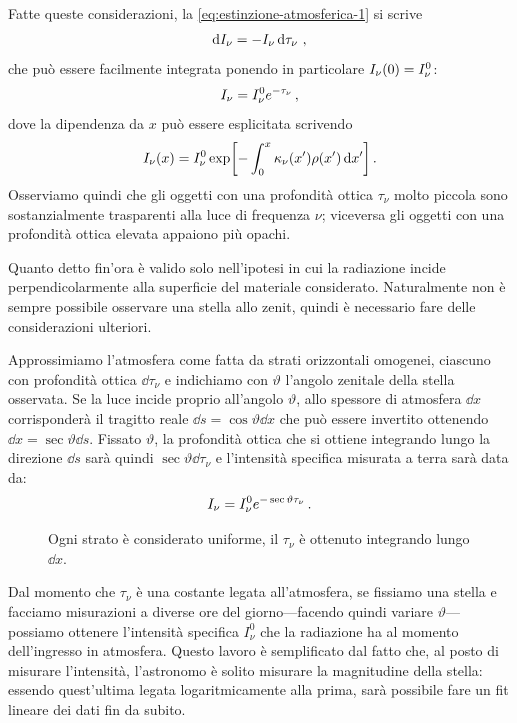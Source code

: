         Fatte queste considerazioni, la \eqref{eq:estinzione-atmosferica-1} si scrive
        \begin{equation}
            \label{eq:estinzione-atmosferica-2}
            \dd{I_\nu} = -I_\nu \dd{\tau_\nu}
            \,,
        \end{equation}
        che può essere facilmente integrata ponendo in particolare $I_\nu\pqty{0} = I_{\nu}^{\text{0}}$:
        \begin{equation}
            I_\nu = I_{\nu}^{\text{0}} e^{-\tau_\nu}
            \,,
        \end{equation}
        dove la dipendenza da $x$ può essere esplicitata scrivendo
        \begin{equation*}
            I_{\nu}\pqty{x} = I_{\nu}^{\text{0}} \exp[-\int_{0}^{x} \kappa_\nu\pqty{x'} \rho\pqty{x'} \dd{x'}]
            \myperiod
        \end{equation*}
        Osserviamo quindi che gli oggetti con una profondità ottica $\tau_\nu$ molto piccola sono sostanzialmente trasparenti alla luce di frequenza $\nu$; viceversa gli oggetti con una profondità ottica elevata appaiono più opachi.
        
        Quanto detto fin'ora è valido solo nell'ipotesi in cui la radiazione incide perpendicolarmente alla superficie del materiale considerato. Naturalmente non è sempre possibile osservare una stella allo zenit, quindi è necessario fare delle considerazioni ulteriori.

        Approssimiamo l'atmosfera come fatta da strati orizzontali omogenei, ciascuno con profondità ottica $\dd{\tau_\nu}$ e indichiamo con $\vartheta$ l'angolo zenitale della stella osservata. Se la luce incide proprio all'angolo $\vartheta$, allo spessore di atmosfera $\dd{x}$ corrisponderà il tragitto reale $\dd{s} = \cos{\vartheta}\dd{x}$ che può essere invertito ottenendo $\dd{x} = \sec{\vartheta}\dd{s}$. Fissato $\vartheta$, la profondità ottica che si ottiene integrando lungo la direzione $\dd{s}$ sarà quindi $\sec{\vartheta}\dd{\tau_\nu}$ e l'intensità specifica misurata a terra sarà data da:
        \begin{equation*}
            I_\nu = I_{\nu}^{0} e^{-\sec{\vartheta}\tau_\nu}
            \,.
        \end{equation*}

        \begin{figure}
            \label{fig:strati-atmo}
            \centering
            
            \caption{Ogni strato è considerato uniforme, il $\tau_\nu$ è ottenuto integrando lungo $\dd{x}$.}
        \end{figure}
        Dal momento che $\tau_{\nu}$ è una costante legata all'atmosfera, se fissiamo una stella e facciamo misurazioni a diverse ore del giorno---facendo quindi variare $\vartheta$---possiamo ottenere l'intensità specifica $I_{\nu}^0$ che la radiazione ha al momento dell'ingresso in atmosfera. Questo lavoro è semplificato dal fatto che, al posto di misurare l'intensità, l'astronomo è solito misurare la magnitudine della stella: essendo quest'ultima legata logaritmicamente alla prima, sarà possibile fare un fit lineare dei dati fin da subito.
